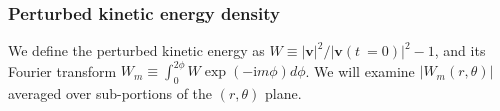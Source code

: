 \subsubsection{Perturbed kinetic energy density}  
We define the perturbed kinetic energy as
$W\equiv|\bm{v}|^2/|\bm{v}(t~=0)|^2 - 1$, and its Fourier transform 
$W_m\equiv\int_0^{2\phi} W\exp{(-\mathrm{i}m\phi)}d\phi$. We will examine
$|W_m(r,\theta)|$ averaged over sub-portions of the $(r,\theta)$
plane. %

